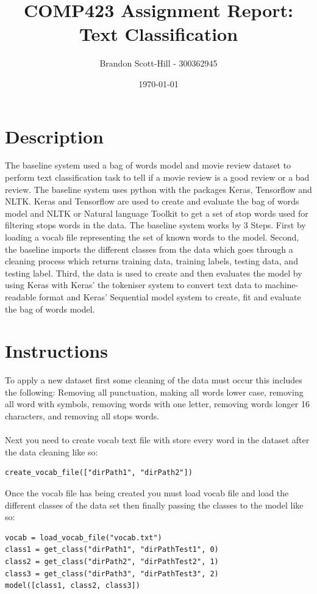 \documentclass{article}
\title{\vspace{-4cm}COMP423 Assignment Report: Text Classification}
\date{\today}
\author{Brandon Scott-Hill - 300362945}
\begin{document}
\maketitle

\section{Description}
The baseline system used a bag of words model and movie review dataset to perform text classification task to tell if a movie review is a good review or a bad review. The baseline system uses python with the packages Keras, Tensorflow and NLTK. Keras and Tensorflow are used to create and evaluate the bag of words model and NLTK or Natural language Toolkit to get a set of stop words used for filtering stops words in the data. The baseline system works by 3 Steps. First by loading a vocab file representing the set of known words to the model. Second, the baseline imports the different classes from the data which goes through a cleaning process which returns training data, training labels, testing data, and testing label. Third, the data is used to create and then evaluates the model by using Keras with Keras’ the tokeniser system to convert text data to machine-readable format and Keras’ Sequential model system to create, fit and evaluate the bag of words model.

\section{Instructions} 

To apply a new dataset first some cleaning of the data must occur this includes the following: Removing all punctuation, making all words lower case, removing all word with symbols, removing words with one letter, removing words longer 16 characters, and removing all stops words.\\
\\
Next you need to create vocab text file with store every word in the dataset after the data cleaning like so:

\begin{lstlisting}
create_vocab_file(["dirPath1", "dirPath2"])
\end{lstlisting}

\noindent 
Once the vocab file has being created you must load vocab file and load the different classes of the data set then finally passing the classes to the model like so:

\begin{lstlisting}
vocab = load_vocab_file("vocab.txt")
class1 = get_class("dirPath1", "dirPathTest1", 0)
class2 = get_class("dirPath2", "dirPathTest2", 1)
class3 = get_class("dirPath3", "dirPathTest3", 2)
model([class1, class2, class3])
\end{lstlisting}
\end{document}
